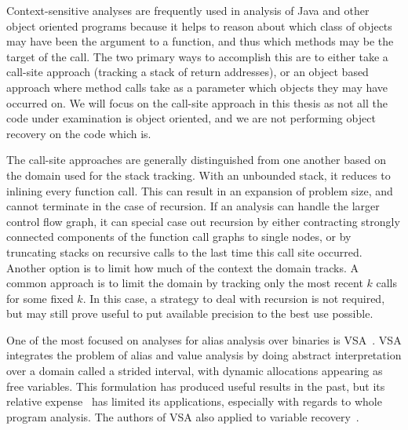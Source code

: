 Context-sensitive analyses are frequently used in analysis of Java and other object oriented programs because it helps to reason about which class of objects may have been the argument to a function, and thus which methods may be the target of the call.
The two primary ways to accomplish this are to either take a call-site approach (tracking a stack of return addresses), or an object based approach where method calls take as a parameter which objects they may have occurred on.
We will focus on the call-site approach in this thesis as not all the code under examination is object oriented, and we are not performing object recovery on the code which is.

The call-site approaches are generally distinguished from one another based on the domain used for the stack tracking.
With an unbounded stack, it reduces to inlining every function call.
This can result in an expansion of problem size, and cannot terminate in the case of recursion.
If an analysis can handle the larger control flow graph, it can special case out recursion by either contracting strongly connected components of the function call graphs to single nodes, or by truncating stacks on recursive calls to the last time this call site occurred.
Another option is to limit how much of the context the domain tracks.
A common approach is to limit the domain by tracking only the most recent $k$ calls for some fixed $k$.
In this case, a strategy to deal with recursion is not required, but may still prove useful to put available precision to the best use possible.

One of the most focused on analyses for alias analysis over binaries is VSA~\cite{vsa}.
VSA integrates the problem of alias and value analysis by doing abstract interpretation over a domain called a strided interval, with dynamic allocations appearing as free variables.
This formulation has produced useful results in the past, but its relative expense~\cite{angr-sok} has limited its applications, especially with regards to whole program analysis.
The authors of VSA also applied to variable recovery~\cite{divine}.
